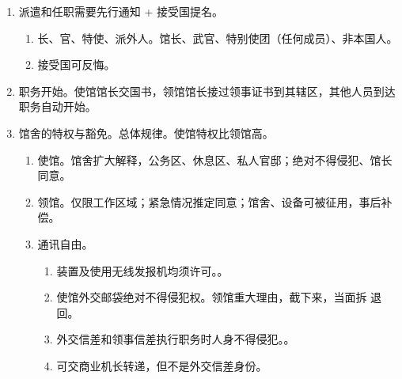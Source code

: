 \begin{enumerate}
        \begin{kk}{三大类人员}
          \begin{enumerate}
            \item 外交人员。馆长、参赞、武官、外交秘书、随员 \yjt 不受欢迎的人。
            \item 行政人员（）和服务人员（） \yjt 不被接受的人。特权和豁免仅限职务范围内。
          \end{enumerate}
          \tcblower
          \begin{enumerate}
            \item 可以在任何时候宣布，不用说明理由，不需要经过同意。
            \item 没来不给来；来了 \yjt 召回 \hz 就地免职 \yjt 没有，不承认 \yjt 限期离境。。
          \end{enumerate}
        \end{kk}
  \item 派遣和任职需要先行通知 + 接受国提名。
        \begin{enumerate}
          \item 长、官、特使、派外人。馆长、武官、特别使团（任何成员）、非本国人。
          \item 接受国可反悔。
        \end{enumerate}
  \item 职务开始。使馆馆长交国书，领馆馆长接过领事证书到其辖区，其他人员到达职务自动开始。
  \item 馆舍的特权与豁免。总体规律。使馆特权比领馆高。
        \begin{enumerate}
          \item 使馆。馆舍扩大解释，公务区、休息区、私人官邸；绝对不得侵犯、馆长同意。
          \item 领馆。仅限工作区域；紧急情况推定同意；馆舍、设备可被征用，事后补偿。
          \item 通讯自由。
                \begin{enumerate}
                  \item 装置及使用无线发报机均须许可。。
                  \item 使馆外交邮袋绝对不得侵犯权。领馆重大理由，截下来，当面拆 \hz 退回。
                  \item 外交信差和领事信差执行职务时人身不得侵犯。。
                  \item 可交商业机长转递，但不是外交信差身份。

\end{enumerate}
\end{enumerate}
\end{enumerate}
